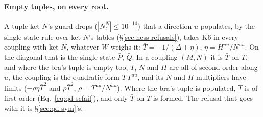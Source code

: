 \documentclass[11pt]{article}
\begin{document}
\paragraph{Empty tuples, on every root.} A tuple ket $N$'s guard drops
($|N^N_t| \le 10^{-14}$) that a direction $u$ populates, by the single-state
rule over ket $N$'s tables (\S\ref{sec:hess-refusals}), takes K6 in every
coupling with ket $N$, whatever $W$ weighs it: $\bar T = -1/(\Delta +
\eta)$, $\eta = H^{uu}/N^{uu}$. On the diagonal that is the single-state
$\bar P$, $\bar Q$. In a coupling $(M, N)$ it is $\bar T$ on $T$, and where
the bra's tuple is empty too, $T$, $N$ and $H$ are all of second order
along $u$, the coupling is the quadratic form $\bar T\,T^{uu}$, and its $N$
and $H$ multipliers have limits ($-\rho\eta\bar T^2$ and $\rho\bar T^2$,
$\rho = T^{uu}/N^{uu}$). Where the bra's tuple is populated, $T$ is of first
order (Eq.~\eqref{eq:qd-scfail}), and only $\bar T$ on $T$ is formed. The
refusal that goes with it is \S\ref{sec:qd-sym}'s.
\end{document}
